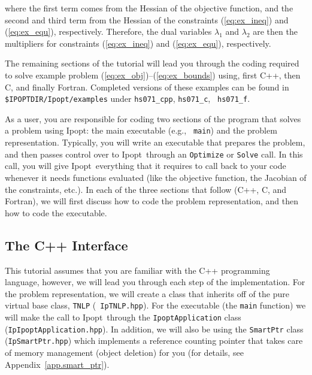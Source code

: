 \documentclass[10pt]{article}
\newcommand{\Ipopt}{{\sc Ipopt}}
\begin{document}
where the first term comes from the Hessian of the objective function,
and the second and third term from the Hessian of the constraints
(\ref{eq:ex_ineq}) and (\ref{eq:ex_equ}), respectively. Therefore, the
dual variables $\lambda_1$ and $\lambda_2$ are then the multipliers
for constraints (\ref{eq:ex_ineq}) and (\ref{eq:ex_equ}), respectively.

\vspace{\baselineskip}

The remaining sections of the tutorial will lead you through
the coding required to solve example problem
(\ref{eq:ex_obj})--(\ref{eq:ex_bounds}) using, first C++, then C, and finally
Fortran. Completed versions of these examples can be found in {\tt
\$IPOPTDIR/Ipopt/examples} under {\tt hs071\_cpp}, {\tt hs071\_c}, {\tt
hs071\_f}.

As a user, you are responsible for coding two sections of the program
that solves a problem using \Ipopt: the main executable (e.g., {\tt
  main}) and the problem representation.  Typically, you will write an
executable that prepares the problem, and then passes control over to
\Ipopt\ through an {\tt Optimize} or {\tt Solve} call. In this call,
you will give \Ipopt\ everything that it requires to call back to your
code whenever it needs functions evaluated (like the objective
function, the Jacobian of the constraints, etc.).  In each of the
three sections that follow (C++, C, and Fortran), we will first
discuss how to code the problem representation, and then how to code
the executable.

\subsection{The C++ Interface}
This tutorial assumes that you are familiar with the C++ programming
language, however, we will lead you through each step of the
implementation. For the problem representation, we will create a class
that inherits off of the pure virtual base class, {\tt TNLP} ({\tt
  IpTNLP.hpp}). For the executable (the {\tt main} function) we will
make the call to \Ipopt\ through the {\tt IpoptApplication} class
({\tt IpIpoptApplication.hpp}). In addition, we will also be using the
{\tt SmartPtr} class ({\tt IpSmartPtr.hpp}) which implements a reference
counting pointer that takes care of memory management (object
deletion) for you (for details, see Appendix~\ref{app.smart_ptr}).
\end{document}
